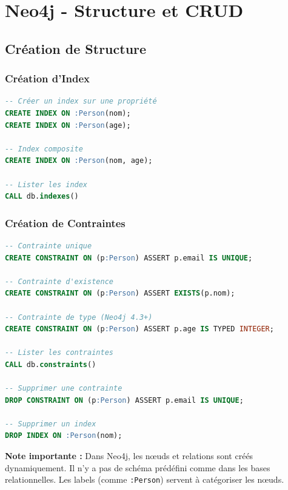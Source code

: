 \documentclass[11pt,a4paper]{article}
\begin{document}
\newpage

\section{Neo4j - Structure et CRUD}

\subsection{Création de Structure}

\subsubsection{Création d'Index}

\begin{lstlisting}[language=SQL]
-- Créer un index sur une propriété
CREATE INDEX ON :Person(nom);
CREATE INDEX ON :Person(age);

-- Index composite
CREATE INDEX ON :Person(nom, age);

-- Lister les index
CALL db.indexes()
\end{lstlisting}

\subsubsection{Création de Contraintes}

\begin{lstlisting}[language=SQL]
-- Contrainte unique
CREATE CONSTRAINT ON (p:Person) ASSERT p.email IS UNIQUE;

-- Contrainte d'existence
CREATE CONSTRAINT ON (p:Person) ASSERT EXISTS(p.nom);

-- Contrainte de type (Neo4j 4.3+)
CREATE CONSTRAINT ON (p:Person) ASSERT p.age IS TYPED INTEGER;

-- Lister les contraintes
CALL db.constraints()

-- Supprimer une contrainte
DROP CONSTRAINT ON (p:Person) ASSERT p.email IS UNIQUE;

-- Supprimer un index
DROP INDEX ON :Person(nom);
\end{lstlisting}

\begin{astucebox}
\textbf{Note importante :} Dans Neo4j, les nœuds et relations sont créés dynamiquement. Il n'y a pas de schéma prédéfini comme dans les bases relationnelles. Les labels (comme \texttt{:Person}) servent à catégoriser les nœuds.
\end{astucebox}
\end{document}
